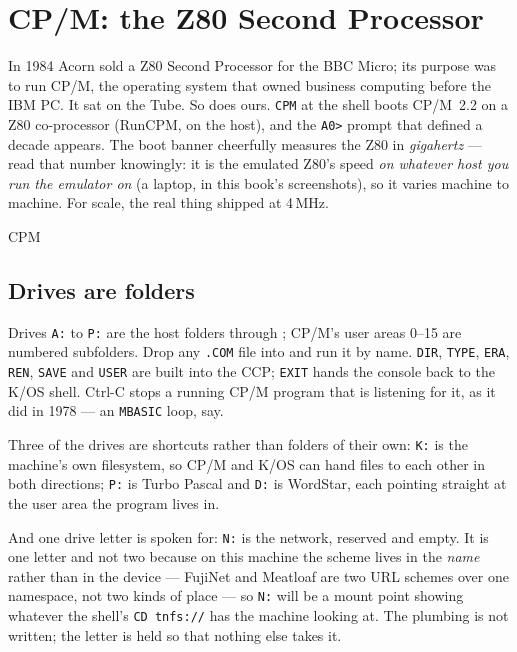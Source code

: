 \chapter{CP/M: the Z80 Second Processor}\label{cha:cpm}

In 1984 Acorn sold a Z80 Second Processor for the BBC Micro; its purpose
was to run CP/M, the operating system that owned business computing before
the IBM PC. It sat on the Tube. So does ours. \verb|CPM| at the shell boots
CP/M~2.2 on a Z80 co-processor (RunCPM, on the host), and the \verb|A0>|
prompt that defined a decade appears. The boot banner cheerfully measures
the Z80 in \emph{gigahertz} --- read that number knowingly: it is the
emulated Z80's speed \emph{on whatever host you run the emulator on} (a
laptop, in this book's screenshots), so it varies machine to machine.
For scale, the real thing shipped at 4\,MHz.

\begin{type}
CPM
\end{type}


\section{Drives are folders}
Drives \verb|A:| to \verb|P:| are the host folders 
through ; CP/M's user areas 0--15 are numbered subfolders.
Drop any \texttt{.COM} file into  and run it by name.
\verb|DIR|, \verb|TYPE|, \verb|ERA|, \verb|REN|, \verb|SAVE| and
\verb|USER| are built into the CCP; \verb|EXIT| hands the console back to
the K/OS shell. Ctrl-C stops a running CP/M program that is listening
for it, as it did in 1978 --- an \verb|MBASIC| loop, say.

Three of the drives are shortcuts rather than folders of their own:
\verb|K:| is the machine's own filesystem, so CP/M and K/OS can hand files
to each other in both directions; \verb|P:| is Turbo Pascal and \verb|D:|
is WordStar, each pointing straight at the user area the program lives in.

And one drive letter is spoken for: \verb|N:| is the network, reserved
and empty. It is one letter and not two because on this machine the
scheme lives in the \emph{name} rather than in the device --- FujiNet
and Meatloaf are two URL schemes over one namespace, not two kinds of
place --- so \verb|N:| will be a mount point showing whatever the
shell's \verb|CD tnfs://| has the machine looking at. The plumbing is
not written; the letter is held so that nothing else takes it.

